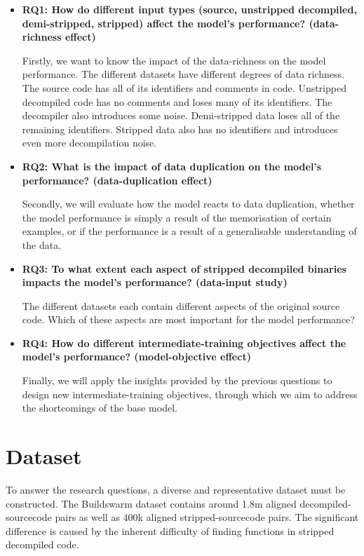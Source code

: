 \begin{itemize}
    \item \textbf{RQ1: How do different input types (source, unstripped decompiled, demi-stripped, stripped) affect the model's performance? (data-richness effect)}
    \begin{sloppypar}
    Firstly, we want to know the impact of the data-richness on the model performance. The different datasets have different degrees of data richness. The source code has all of its identifiers and comments in code. Unstripped decompiled code has no comments and loses many of its identifiers. The decompiler also introduces some noise. Demi-stripped data loses all of the remaining identifiers. Stripped data also has no identifiers and introduces even more decompilation noise.
    \end{sloppypar}
    \item \textbf{RQ2: What is the impact of data duplication on the model's performance? (data-duplication effect)}
    \begin{sloppypar}
    Secondly, we will evaluate how the model reacts to data duplication, whether the model performance is simply a result of the memorisation of certain examples, or if the performance is a result of a generalisable understanding of the data.
    \end{sloppypar}
    \item \textbf{RQ3: To what extent each aspect of stripped decompiled binaries impacts the model's performance? (data-input study)}
    \begin{sloppypar}
    The different datasets each contain different aspects of the original source code. Which of these aspects are most important for the model performance? 
    \end{sloppypar}
    \item \textbf{RQ4: How do different intermediate-training objectives affect the model's performance? (model-objective effect)}
    \begin{sloppypar}
    Finally, we will apply the insights provided by the previous questions to design new intermediate-training objectives, through which we aim to address the shortcomings of the base model. 
    \end{sloppypar}
\end{itemize}

\section{Dataset}
To answer the research questions, a diverse and representative dataset must be constructed. The Buildswarm dataset contains around 1.8m aligned decompiled-sourcecode pairs as well as 400k aligned stripped-sourcecode pairs. The significant difference is caused by the inherent difficulty of finding functions in stripped decompiled code. 

